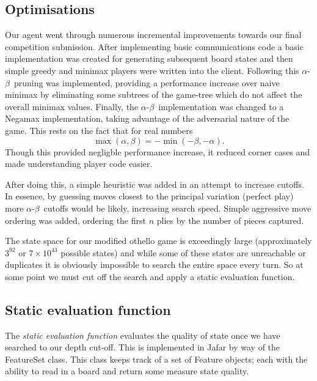 \documentclass[11pt]{article}
\newcommand{\ab}{$\alpha$-$\beta$}
\begin{document}


\subsection{Optimisations}
\label{sub:optimisations}
Our agent went through numerous incremental improvements towards our final
competition submission. After implementing basic communications code a basic
implementation was created for generating subsequent board states and then
simple greedy and minimax players were written into the client. Following
this \ab\ pruning was implemented, providing a performance increase over
naive minimax by eliminating some subtrees of the game-tree which do not
affect the overall minimax values.
Finally, the \ab\ implementation was
changed to a Negamax implementation, taking advantage of the adversarial
nature of the game. This rests on the fact that for real numbers
\[
  \max(\alpha, \beta) = -\min(-\beta, -\alpha).
\]
Though this provided negligble performance increase, it
reduced corner cases and made understanding player code easier.

After doing this, a simple heuristic was added in an attempt to increase
cutoffs. In essence, by guessing moves closest to the principal variation
(perfect play) more \ab\ cutoffs would be likely, increasing search speed.
Simple aggressive move ordering was added, ordering the first $n$ plies by the
number of pieces captured.

The state space for our modified othello game is exceedingly large
(approximately $3^{92}$ or $7 \times 10^{43}$ possible states) and while some
of these states are unreachable or duplicates it is obviously impossible to
search the entire space every turn. So at some point we must cut off the
search and apply a static evaluation function.

\subsection{Static evaluation function}
\label{sub:eval_func}
The \emph{static evaluation function} evaluates the quality of state once we have searched to our depth cut-off.
This is implemented in Jafar by way of the FeatureSet class. This class keeps
track of a set of Feature objects; each with the ability to read in a board and
return some measure state quality.
\end{document}
